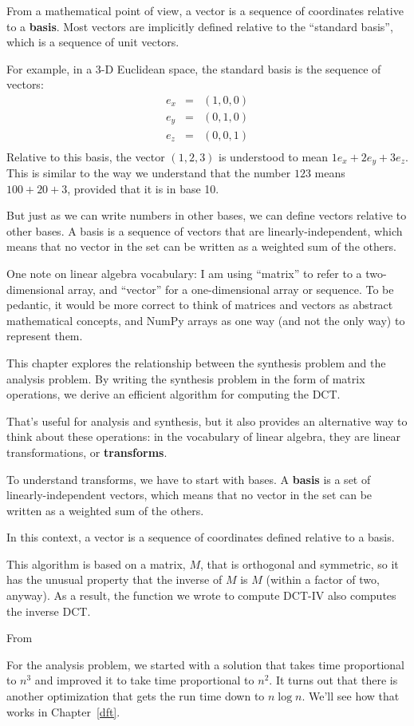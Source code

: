 \documentclass[12pt]{book}
\begin{document}
From a mathematical point of view, a vector is a sequence of
coordinates relative to a {\bf basis}.  Most vectors are implicitly
defined relative to the ``standard basis'', which is a sequence
of unit vectors.

For example, in a 3-D Euclidean space, the standard basis is the
sequence of vectors:
%
\begin{eqnarray}
e_x &=& (1, 0, 0) \\
e_y &=& (0, 1, 0) \\
e_z &=& (0, 0, 1) \\
\end{eqnarray}
%
Relative to this basis, the vector $(1, 2, 3)$ is understood to
mean $1 e_x + 2 e_y + 3 e_z$.  This is similar to the way we
understand that the number $123$ means $100 + 20 + 3$, provided
that it is in base 10.

But just as we can write numbers in other bases, we can define vectors
relative to other bases.  A basis is a sequence of vectors that
are linearly-independent, which means that no vector in the set
can be written as a weighted sum of the others.





One note on linear algebra vocabulary: I am using ``matrix'' to refer
to a two-dimensional array, and ``vector'' for a one-dimensional array
or sequence.  To be pedantic, it would be more correct to think
of matrices and vectors as abstract mathematical concepts, and NumPy
arrays as one way (and not the only way) to represent them.


This chapter explores the relationship between the synthesis problem
and the analysis problem.  By writing the synthesis problem in the
form of matrix operations, we derive an efficient algorithm for computing
the DCT.

That's useful for analysis and synthesis, but it also provides
an alternative way to think about these operations: in the vocabulary
of linear algebra, they are linear transformations, or {\bf transforms}.

To understand transforms, we have to start with bases.  A {\bf basis}
is a set of linearly-independent vectors, which means that no
vector in the set can be written as a weighted sum of the others.

In this context, a vector is a sequence of coordinates defined
relative to a basis.  



This algorithm is based on a matrix, $M$, that is orthogonal and
symmetric, so it has the unusual property that the inverse of $M$ is
$M$ (within a factor of two, anyway).  As a result, the function we
wrote to compute DCT-IV also computes the inverse DCT.

From 


For the analysis problem, we started with a solution that
takes time proportional to $n^3$ and improved it to take time
proportional to $n^2$.  It turns out that there is another optimization
that gets the run time down to $n \log n$.  We'll see how that works
in Chapter~\ref{dft}.
\end{document}
